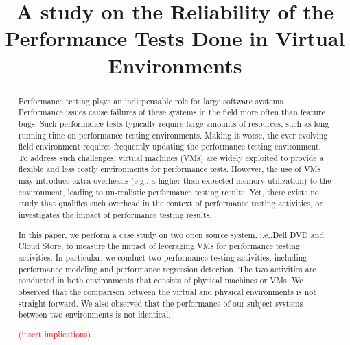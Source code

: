 \documentclass[10pt, conference]{IEEEtran}
\begin{document}
\title{A study on the Reliability of the Performance Tests Done in Virtual Environments}

\author{

}

\maketitle

	\begin{abstract}
		Performance testing plays an indispensable role for large software systems. Performance issues cause failures of these systems in the field more often than feature bugs. Such performance tests typically require large amounts of resources, such as long running time on performance testing environments. Making it worse, the ever evolving field environment requires frequently updating the performance testing environment. To address such challenges, virtual machines (VMs) are widely exploited to provide a flexible and less costly environments for performance tests. However, the use of VMs may introduce extra overheads (e.g., a higher than expected memory utilization) to the environment, leading to un-realistic performance testing results. Yet, there exists no study that qualifies such overhead in the context of performance testing activities, or investigates the impact of performance testing results. 
		
		In this paper, we perform a case study on two open source system, i.e.,Dell DVD and Cloud Store, to measure the impact of leveraging VMs for performance testing activities. In particular, we conduct two performance testing activities, including performance modeling and performance regression detection. The two activities are conducted in both environments that consists of physical machines or VMs. We observed that the comparison between the virtual and physical environments is not straight forward. We also observed that the performance of our subject systems between two environments is not identical.
		
		\textcolor{red}{(insert implications)}
	
	\end{abstract}
	
\end{document}
